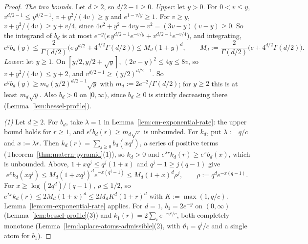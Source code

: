 \begin{proof}
\leanok
{}
\emph{The two bounds.} Let $d \ge 2$, so $d/2 - 1 \ge 0$. \emph{Upper}: let $y > 0$. For
$0 < v \le y$, $v^{d/2-1} \le y^{d/2-1}$, $v + y^2/(4v) \ge y$ and $e^{1 - v/y} \ge 1$. For $v \ge y$,
$v + y^2/(4v) \ge y + v/4$, since $4v^2 + y^2 - 4vy - v^2 = (3v - y)(v - y) \ge 0$. So the integrand
of $b_d$ is at most $e^{-y}\bigl(e\,y^{d/2-1}e^{-v/y} + v^{d/2-1}e^{-v/4}\bigr)$, and integrating,
\[
  e^yb_d(y) \le \frac{2}{\Gamma(d/2)}\bigl(e\,y^{d/2} + 4^{d/2}\Gamma(d/2)\bigr)
  \le M_d(1 + y)^d , \qquad M_d := \frac{2}{\Gamma(d/2)}\bigl(e + 4^{d/2}\Gamma(d/2)\bigr) .
\]
\emph{Lower}: let $y \ge 1$. On $[y/2, y/2 + \sqrt y]$, $(2v - y)^2 \le 4y \le 8v$, so
$v + y^2/(4v) \le y + 2$, and $v^{d/2-1} \ge (y/2)^{d/2-1}$. So
$e^yb_d(y) \ge m_d(y/2)^{d/2-1}\sqrt y$ with $m_d := 2e^{-2}/\Gamma(d/2)$; for $y \ge 2$ this is at
least $m_d\sqrt y$. Also $b_d > 0$ on $[0, \infty)$, since $b_d \ge 0$ is strictly decreasing there
(Lemma~\ref{lem:bessel-profile}).

\emph{(1)} Let $d \ge 2$. For $b_d$, take $\lambda = 1$ in Lemma~\ref{lem:cm-exponential-rate}: the
upper bound holds for $r \ge 1$, and $e^rb_d(r) \ge m_d\sqrt r$ is unbounded. For $k_d$, put
$\lambda := q/c$ and $x := \lambda r$. Then $k_d(r) = \sum_{j \ge 0}b_d(xq^j)$, a series of positive
terms (Theorem~\ref{thm:matern-pyramid}(1)), so $k_d > 0$ and $e^{\lambda r}k_d(r) \ge e^xb_d(x)$,
which is unbounded. Above, $1 + xq^j \le q^j(1 + x)$ and $q^j - 1 \ge j(q - 1)$ give
\[
  e^xb_d(xq^j) \le M_d(1 + xq^j)^de^{-x(q^j - 1)} \le M_d(1 + x)^d\rho^j ,
  \qquad \rho := q^de^{-x(q - 1)} .
\]
For $x \ge \log(2q^d)/(q - 1)$, $\rho \le 1/2$, so $e^{\lambda r}k_d(r) \le 2M_d(1 + x)^d \le
2M_dK^d(1 + r)^d$ with $K := \max(1, q/c)$. Lemma~\ref{lem:cm-exponential-rate} applies. For $d = 1$,
$b_1 = 2e^{-y}$ on $(0, \infty)$ (Lemma~\ref{lem:bessel-profile}(3)) and
$k_1(r) = 2\sum_ie^{-rq^i/c}$, both completely monotone (Lemma~\ref{lem:laplace-atoms-admissible}(2),
with $\vartheta_i = q^i/c$ and a single atom for $b_1$).


\end{proof}
